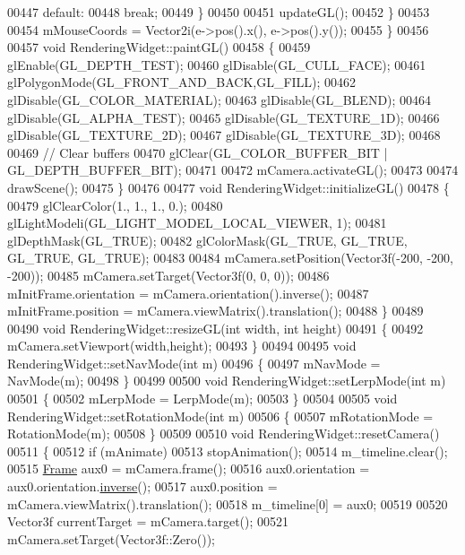 \begin{DoxyCode}
00447           \textcolor{keywordflow}{default}:
00448             \textcolor{keywordflow}{break};
00449         \}
00450 
00451         updateGL();
00452     \}
00453 
00454     mMouseCoords = Vector2i(e->pos().x(), e->pos().y());
00455 \}
00456 
00457 \textcolor{keywordtype}{void} RenderingWidget::paintGL()
00458 \{
00459   glEnable(GL\_DEPTH\_TEST);
00460   glDisable(GL\_CULL\_FACE);
00461   glPolygonMode(GL\_FRONT\_AND\_BACK,GL\_FILL);
00462   glDisable(GL\_COLOR\_MATERIAL);
00463   glDisable(GL\_BLEND);
00464   glDisable(GL\_ALPHA\_TEST);
00465   glDisable(GL\_TEXTURE\_1D);
00466   glDisable(GL\_TEXTURE\_2D);
00467   glDisable(GL\_TEXTURE\_3D);
00468 
00469   \textcolor{comment}{// Clear buffers}
00470   glClear(GL\_COLOR\_BUFFER\_BIT | GL\_DEPTH\_BUFFER\_BIT);
00471 
00472   mCamera.activateGL();
00473 
00474   drawScene();
00475 \}
00476 
00477 \textcolor{keywordtype}{void} RenderingWidget::initializeGL()
00478 \{
00479   glClearColor(1., 1., 1., 0.);
00480   glLightModeli(GL\_LIGHT\_MODEL\_LOCAL\_VIEWER, 1);
00481   glDepthMask(GL\_TRUE);
00482   glColorMask(GL\_TRUE, GL\_TRUE, GL\_TRUE, GL\_TRUE);
00483 
00484   mCamera.setPosition(Vector3f(-200, -200, -200));
00485   mCamera.setTarget(Vector3f(0, 0, 0));
00486   mInitFrame.orientation = mCamera.orientation().inverse();
00487   mInitFrame.position = mCamera.viewMatrix().translation();
00488 \}
00489 
00490 \textcolor{keywordtype}{void} RenderingWidget::resizeGL(\textcolor{keywordtype}{int} width, \textcolor{keywordtype}{int} height)
00491 \{
00492     mCamera.setViewport(width,height);
00493 \}
00494 
00495 \textcolor{keywordtype}{void} RenderingWidget::setNavMode(\textcolor{keywordtype}{int} m)
00496 \{
00497   mNavMode = NavMode(m);
00498 \}
00499 
00500 \textcolor{keywordtype}{void} RenderingWidget::setLerpMode(\textcolor{keywordtype}{int} m)
00501 \{
00502   mLerpMode = LerpMode(m);
00503 \}
00504 
00505 \textcolor{keywordtype}{void} RenderingWidget::setRotationMode(\textcolor{keywordtype}{int} m)
00506 \{
00507   mRotationMode = RotationMode(m);
00508 \}
00509 
00510 \textcolor{keywordtype}{void} RenderingWidget::resetCamera()
00511 \{
00512   \textcolor{keywordflow}{if} (mAnimate)
00513     stopAnimation();
00514   m\_timeline.clear();
00515   \hyperlink{class_frame}{Frame} aux0 = mCamera.frame();
00516   aux0.orientation = aux0.orientation.\hyperlink{group___geometry___module_a6a1d8af1fe34cb4127f705c0d10ef649}{inverse}();
00517   aux0.position = mCamera.viewMatrix().translation();
00518   m\_timeline[0] = aux0;
00519 
00520   Vector3f currentTarget = mCamera.target();
00521   mCamera.setTarget(Vector3f::Zero());

\end{DoxyCode}
